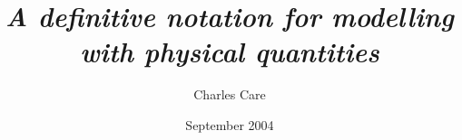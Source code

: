 \documentclass[a4paper,landscape]{slides}
\title{\itshape
   A definitive notation for modelling \\ with physical quantities}
\author{Charles Care}
\date{September 2004}
\begin{document}
\pagecolor{bgColour}
\color{textColour}

\begin{slide}
\maketitle
\end{slide}




\begin{slide}
\maketitle
\end{slide}
\end{document}
